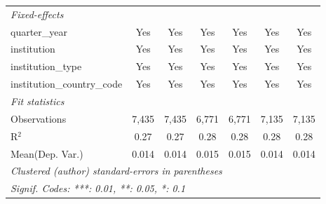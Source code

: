 \begin{tabular}{lcccccc}
   \emph{Fixed-effects}\\
   quarter\_year                      & Yes     & Yes       & Yes     & Yes      & Yes     & Yes\\  
   institution                        & Yes     & Yes       & Yes     & Yes      & Yes     & Yes\\  
   institution\_type                  & Yes     & Yes       & Yes     & Yes      & Yes     & Yes\\  
   institution\_country\_code         & Yes     & Yes       & Yes     & Yes      & Yes     & Yes\\  
   \midrule
   \emph{Fit statistics}\\
   Observations                       & 7,435   & 7,435     & 6,771   & 6,771    & 7,135   & 7,135\\  
   R$^2$                              & 0.27    & 0.27      & 0.28    & 0.28     & 0.28    & 0.28\\  
Mean(Dep. Var.) & 0.014 & 0.014 & 0.015 & 0.015 & 0.014 & 0.014 \\
   \midrule \midrule
   \multicolumn{7}{l}{\emph{Clustered (author) standard-errors in parentheses}}\\
   \multicolumn{7}{l}{\emph{Signif. Codes: ***: 0.01, **: 0.05, *: 0.1}}\\
\end{tabular}
\par\endgroup
